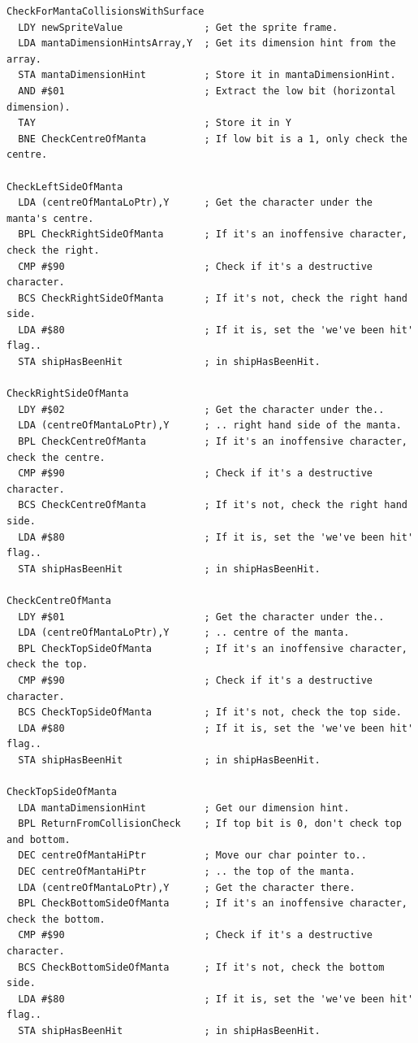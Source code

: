 \clearpage
\begin{lstlisting}[basicstyle=\scriptsize\ttfamily]
CheckForMantaCollisionsWithSurface
  LDY newSpriteValue              ; Get the sprite frame.
  LDA mantaDimensionHintsArray,Y  ; Get its dimension hint from the array.
  STA mantaDimensionHint          ; Store it in mantaDimensionHint.
  AND #$01                        ; Extract the low bit (horizontal dimension).
  TAY                             ; Store it in Y
  BNE CheckCentreOfManta          ; If low bit is a 1, only check the centre.

CheckLeftSideOfManta
  LDA (centreOfMantaLoPtr),Y      ; Get the character under the manta's centre.
  BPL CheckRightSideOfManta       ; If it's an inoffensive character, check the right.
  CMP #$90                        ; Check if it's a destructive character.
  BCS CheckRightSideOfManta       ; If it's not, check the right hand side.
  LDA #$80                        ; If it is, set the 'we've been hit' flag..
  STA shipHasBeenHit              ; in shipHasBeenHit.

CheckRightSideOfManta
  LDY #$02                        ; Get the character under the..
  LDA (centreOfMantaLoPtr),Y      ; .. right hand side of the manta.
  BPL CheckCentreOfManta          ; If it's an inoffensive character, check the centre.
  CMP #$90                        ; Check if it's a destructive character.
  BCS CheckCentreOfManta          ; If it's not, check the right hand side.
  LDA #$80                        ; If it is, set the 'we've been hit' flag..
  STA shipHasBeenHit              ; in shipHasBeenHit.

CheckCentreOfManta
  LDY #$01                        ; Get the character under the..
  LDA (centreOfMantaLoPtr),Y      ; .. centre of the manta.
  BPL CheckTopSideOfManta         ; If it's an inoffensive character, check the top.
  CMP #$90                        ; Check if it's a destructive character.
  BCS CheckTopSideOfManta         ; If it's not, check the top side.
  LDA #$80                        ; If it is, set the 'we've been hit' flag..
  STA shipHasBeenHit              ; in shipHasBeenHit.

CheckTopSideOfManta
  LDA mantaDimensionHint          ; Get our dimension hint.
  BPL ReturnFromCollisionCheck    ; If top bit is 0, don't check top and bottom.
  DEC centreOfMantaHiPtr          ; Move our char pointer to..
  DEC centreOfMantaHiPtr          ; .. the top of the manta.
  LDA (centreOfMantaLoPtr),Y      ; Get the character there.
  BPL CheckBottomSideOfManta      ; If it's an inoffensive character, check the bottom.
  CMP #$90                        ; Check if it's a destructive character.
  BCS CheckBottomSideOfManta      ; If it's not, check the bottom side.
  LDA #$80                        ; If it is, set the 'we've been hit' flag..
  STA shipHasBeenHit              ; in shipHasBeenHit.


\end{lstlisting}
